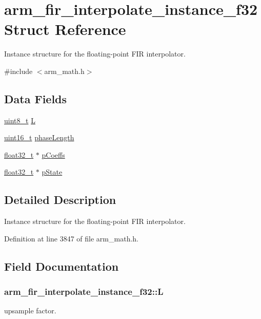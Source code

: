\hypertarget{structarm__fir__interpolate__instance__f32}{\section{arm\-\_\-fir\-\_\-interpolate\-\_\-instance\-\_\-f32 Struct Reference}
\label{structarm__fir__interpolate__instance__f32}
}


Instance structure for the floating-\/point F\-I\-R interpolator.  




{\ttfamily \#include $<$arm\-\_\-math.\-h$>$}

\subsection*{Data Fields}
\begin{DoxyCompactItemize}
\item 
\hyperlink{stdint_8h_aba7bc1797add20fe3efdf37ced1182c5}{uint8\-\_\-t} \hyperlink{structarm__fir__interpolate__instance__f32_ae6f94dcc0ccd8aa4bc699b20985d9df5}{L}
\item 
\hyperlink{stdint_8h_a273cf69d639a59973b6019625df33e30}{uint16\-\_\-t} \hyperlink{structarm__fir__interpolate__instance__f32_a389e669e13ec56292a70db8e92194b12}{phase\-Length}
\item 
\hyperlink{arm__math_8h_a4611b605e45ab401f02cab15c5e38715}{float32\-\_\-t} $\ast$ \hyperlink{structarm__fir__interpolate__instance__f32_a86053b715980a93c9df630d6de5bb63c}{p\-Coeffs}
\item 
\hyperlink{arm__math_8h_a4611b605e45ab401f02cab15c5e38715}{float32\-\_\-t} $\ast$ \hyperlink{structarm__fir__interpolate__instance__f32_a42a8ba1bda85fa86d7b6c84d3da4c75b}{p\-State}
\end{DoxyCompactItemize}


\subsection{Detailed Description}
Instance structure for the floating-\/point F\-I\-R interpolator. 

Definition at line 3847 of file arm\-\_\-math.\-h.



\subsection{Field Documentation}
\hypertarget{structarm__fir__interpolate__instance__f32_ae6f94dcc0ccd8aa4bc699b20985d9df5}{
\subsubsection[{L}]{ arm\-\_\-fir\-\_\-interpolate\-\_\-instance\-\_\-f32\-::\-L}}\label{structarm__fir__interpolate__instance__f32_ae6f94dcc0ccd8aa4bc699b20985d9df5}
upsample factor. 


